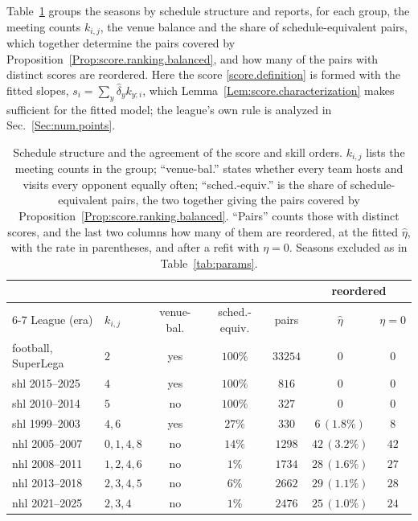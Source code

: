 \documentclass[letterpaper,12pt]{article}
\begin{document}
Table~\ref{tab:schedule} groups the seasons by schedule structure and reports, for each group, the meeting counts $k_{i,j}$, the venue balance and the share of schedule-equivalent pairs, which together determine the pairs covered by Proposition~\ref{Prop:score.ranking.balanced}, and how many of the pairs with distinct scores are reordered. Here the score \eqref{score.definition} is formed with the fitted slopes, $s_i=\sum_y\hat\delta_y k_{y;i}$, which Lemma~\ref{Lem:score.characterization} makes sufficient for the fitted model; the league's own rule is analyzed in Sec.~\ref{Sec:num.points}.



\begin{table}[!b]
\centering
\caption{Schedule structure and the agreement of the score and skill orders.
$k_{i,j}$ lists the meeting counts in the group; ``venue-bal.'' states whether every team
hosts and visits every opponent equally often; ``sched.-equiv.'' is the share of
schedule-equivalent pairs, the two together giving the pairs covered by
Proposition~\ref{Prop:score.ranking.balanced}. ``Pairs'' counts those with distinct
scores, and the last two columns how many of them are reordered, at the fitted $\hat\eta$,
with the rate in parentheses, and after a refit with $\eta=0$. Seasons excluded as in Table~\ref{tab:params}.}
\label{tab:schedule}
{\footnotesize\setlength{\tabcolsep}{4pt}
\begin{tabular}{llccccc}
\hline
 & & & & & \multicolumn{2}{c}{reordered}\\
\cline{6-7}
League (era) & $k_{i,j}$ & venue-bal. & sched.-equiv. & pairs & $\hat\eta$ & $\eta=0$\\
\hline
football, SuperLega  & $2$       & yes & $100\%$ & $33254$ & $0$ & $0$\\
\gls{shl} 2015--2025 & $4$       & yes & $100\%$ & $816$   & $0$  & $0$\\
\gls{shl} 2010--2014 & $5$       & no  & $100\%$ & $327$   & $0$  & $0$\\
\gls{shl} 1999--2003 & $4,6$     & yes & $27\%$  & $330$   & $6\,(1.8\%)$  & $8$\\
\gls{nhl} 2005--2007 & $0,1,4,8$ & no  & $14\%$  & $1298$  & $42\,(3.2\%)$ & $42$\\
\gls{nhl} 2008--2011 & $1,2,4,6$ & no  & $1\%$   & $1734$  & $28\,(1.6\%)$ & $27$\\
\gls{nhl} 2013--2018 & $2,3,4,5$ & no  & $6\%$   & $2662$  & $29\,(1.1\%)$ & $28$\\
\gls{nhl} 2021--2025 & $2,3,4$   & no  & $1\%$   & $2476$  & $25\,(1.0\%)$ & $24$\\
\hline
\end{tabular}}
\end{table}
\end{document}
